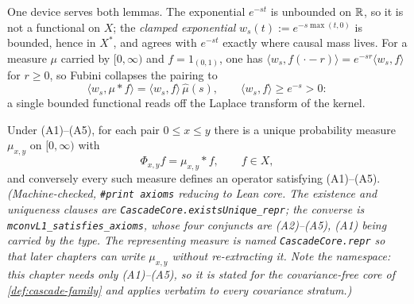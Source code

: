 One device serves both lemmas. The exponential $e^{-st}$ is unbounded on $\mathbb{R}$, so it is
not a functional on $X$; the \emph{clamped exponential} $w_s(t) := e^{-s\max(t,0)}$ is
bounded, hence in $X^*$, and agrees with $e^{-st}$ exactly where causal mass lives. For a
measure $\mu$ carried by $[0,\infty)$ and $f = 1_{(0,1)}$, one has
$\langle w_s, f(\cdot - r)\rangle = e^{-sr}\langle w_s, f\rangle$ for $r \ge 0$, so Fubini
collapses the pairing to
\begin{equation}\label{eq:clamped}
  \langle w_s, \mu * f\rangle = \langle w_s, f\rangle\,\hat\mu(s),
  \qquad \langle w_s, f\rangle \ge e^{-s} > 0 :
\end{equation}
a single bounded functional reads off the Laplace transform of the kernel.

\begin{lemma}[representation]\label{lem:convolution-representation}
\leanok
Under (A1)--(A5), for each pair $0 \le x \le y$ there is a unique probability measure
$\mu_{x,y}$ on $[0,\infty)$ with
\[
  \Phi_{x,y} f = \mu_{x,y} * f, \qquad f \in X,
\]
and conversely every such measure defines an operator satisfying (A1)--(A5).
\statusT\quad\emph{(Machine-checked, \texttt{\#print axioms} reducing to Lean core. The
existence and uniqueness clauses are
\texttt{CascadeCore.existsUnique\_repr}; the converse is
\texttt{mconvL1\_satisfies\_axioms}, whose four conjuncts are (A2)--(A5), (A1) being carried by
the type. The representing measure is named
\texttt{CascadeCore.repr} so that later chapters can write $\mu_{x,y}$ without re-extracting
it. Note the namespace: this chapter needs only (A1)--(A5), so it is stated for the
covariance-free core of \ref{def:cascade-family} and applies verbatim to every covariance
stratum.)}
\end{lemma}

